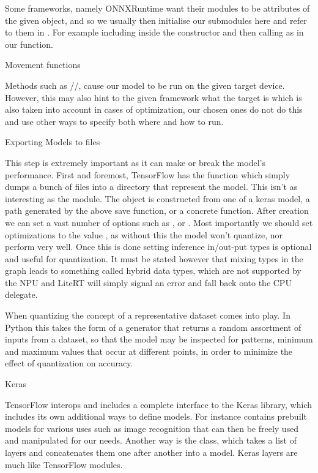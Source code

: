 \secc {}

Some frameworks, namely ONNXRuntime want their modules
to be attributes of the given object,
and so we usually then initialise our submodules here and refer to them in .
For example including  inside the constructor
and then calling as  in our  function.

\secc Movement functions

Methods such as //,
cause our model to be run on the given target device.
However, this may also hint to the given framework
what the target is which is also taken into account
in cases of optimization,
our chosen ones do not do this and use other ways to specify both
where and how to run.

\sec Exporting Models to files

This step is extremely important as it can make or break
the model's performance.
First and foremost, TensorFlow has the function
which simply dumps a bunch of files into a directory
that represent the model.
This isn't as interesting as the 
module.
The  object is constructed from
one of a keras model,
a  path generated by the above save function,
or a concrete function.
After creation we can set a vast number of options
such as , 
or .
Most importantly we should set optimizations to the value
,
as without this the model won't quantize,
nor perform very well.
Once this is done setting inference in/out-put types
is optional and useful for quantization.
It must be stated however that
mixing types in the graph leads to something called
hybrid data types,
which are not supported by the NPU
and LiteRT will simply signal an error
and fall back onto the CPU delegate.

When quantizing the concept of a representative dataset comes into play.
In Python this takes the form of a generator
that returns a random assortment of inputs from a dataset,
so that the model may be inspected
for patterns,
minimum and maximum values that occur at different points,
in order to minimize the effect of quantization on accuracy.

\sec Keras

TensorFlow interops and includes a complete interface to the Keras library,
which includes its own additional ways to define models.
For instance  contains prebuilt models
for various uses such as image recognition
that can then be freely used and manipulated for our needs.
Another way is the  class,
which takes a list of layers and concatenates them
one after another into a model.
Keras layers are much like TensorFlow modules.

